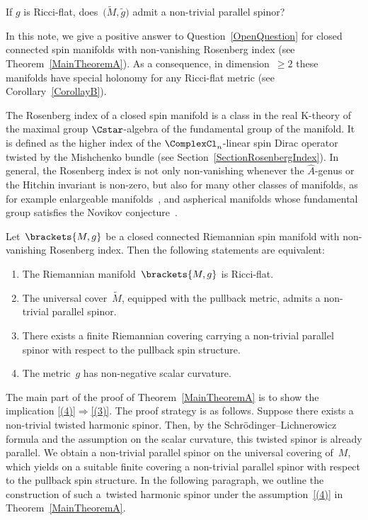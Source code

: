\documentclass[pdftex]{sigma}
\numberwithin{equation}{section}
\begin{document}
\begin{que} \label{OpenQuestion}
 If $g$ is Ricci-flat, does~$\bigl(\tilde{M},\tilde{g}\bigr)$ admit a non-trivial parallel spinor?
\end{que}

In this note, we give a positive answer to Question~\ref{OpenQuestion} for closed connected spin manifolds with non-vanishing Rosenberg index (see Theorem~\ref{MainTheoremA}). As a consequence, in dimension~$\geq 2$ these manifolds have special holonomy for any Ricci-flat metric (see Corollary~\ref{CorollayB}).

The Rosenberg index of a closed spin manifold is a class in the real K-theory of the maximal group $\Cstar$-algebra of the fundamental group of the manifold. It is defined as the higher index of the $\ComplexCl_n$-linear spin Dirac operator twisted by the Mishchenko bundle (see Section~\ref{SectionRosenbergIndex}). In general, the Rosenberg index is not only non-vanishing whenever the $\hat{A}$-genus or the Hitchin invariant is non-zero, but also for many other classes of manifolds, as for example enlargeable manifolds~\cite{Hanke2006, Hanke2007}, and aspherical manifolds whose fundamental group satisfies the Novikov conjecture~\cite{Rosenberg1983}.
%
\begin{prethm} \label{MainTheoremA}
 Let~$\brackets{M,g}$ be a closed connected Riemannian spin manifold with non-vanishing Rosenberg index. Then the following statements are equivalent:
 \begin{enumerate}\itemsep=0pt
 \item \label{(1)}
 The Riemannian manifold~$\brackets{M,g}$ is Ricci-flat.
 \item \label{(2)}
 The universal cover~$\tilde{M}$, equipped with the pullback metric, admits a non-trivial parallel spinor.
 \item \label{(3)}
 There exists a finite Riemannian covering carrying a non-trivial parallel spinor with respect to the pullback spin structure.
 \item \label{(4)}
 The metric~$g$ has non-negative scalar curvature.
 \end{enumerate}
\end{prethm}

The main part of the proof of Theorem~\ref{MainTheoremA} is to show the implication \ref{(4)}$\Rightarrow$\ref{(3)}. The proof strategy is as follows. Suppose there exists a non-trivial twisted harmonic spinor. Then, by the Schr\"odinger--Lichnerowicz formula and the assumption on the scalar curvature, this twisted spinor is already parallel. We obtain a non-trivial parallel spinor on the universal covering of~$M$, which yields on a suitable finite covering a non-trivial parallel spinor with respect to the pullback spin structure. In the following paragraph, we outline the construction of such a~twisted harmonic spinor under the assumption~\ref{(4)} in Theorem~\ref{MainTheoremA}.
\end{document}
